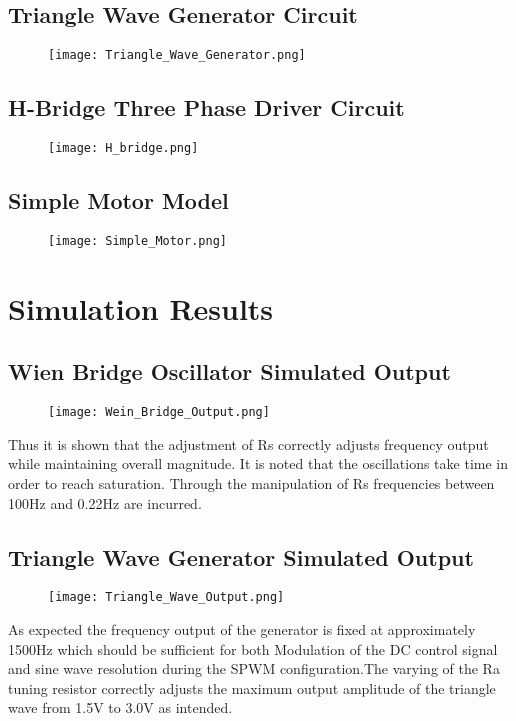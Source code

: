 \documentclass[12pt]{article}
\begin{document}
\begin{appendices}
\subsection{Triangle Wave Generator Circuit}
\begin{figure}[H]
\centering
\texttt{[image: Triangle\_Wave\_Generator.png]}
\label{Overall_Design_V1}
\end{figure}
\subsection{H-Bridge Three Phase Driver Circuit}
\begin{figure}[H]
\centering
\texttt{[image: H\_bridge.png]}
\label{Overall_Design_V1}
\end{figure}
\subsection{Simple Motor Model}
\begin{figure}[H]
\centering
\texttt{[image: Simple\_Motor.png]}
\label{Overall_Design_V1}
\end{figure}

\section{Simulation Results}

\subsection{Wien Bridge Oscillator Simulated Output}
\begin{figure}[H]
\centering
\texttt{[image: Wein\_Bridge\_Output.png]}
\label{Triangle_Gen_Output}
\end{figure}
Thus it is shown that the adjustment of Rs correctly adjusts frequency output while maintaining overall magnitude. It is noted that the oscillations take time in order to reach saturation. Through the manipulation of Rs frequencies between 100Hz and 0.22Hz are incurred.

\subsection{Triangle Wave Generator Simulated Output}

\begin{figure}[H]
\centering
\texttt{[image: Triangle\_Wave\_Output.png]}
\label{Triangle_Gen_Output}
\end{figure}
As expected the frequency output of the generator is fixed at approximately 1500Hz which should be sufficient for both Modulation of the DC control signal and sine wave resolution during the SPWM configuration.The varying of the Ra tuning resistor correctly adjusts the maximum output amplitude of the triangle wave from 1.5V to 3.0V as intended.


\end{appendices}
\end{document}
